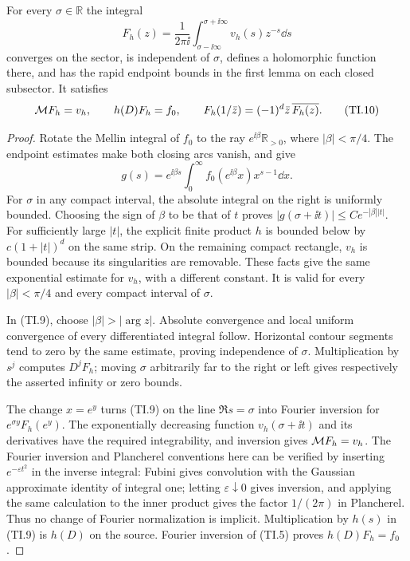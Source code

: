 \begin{proposition}
For every $\sigma\in\mathbb R$ the integral
\begin{equation}
 F_h(z)=\frac1{2\pi\ii}\int_{\sigma-\ii\infty}^{\sigma+\ii\infty}
 v_h(s)z^{-s}\dd s \tag{TI.9}
\end{equation}
converges on the sector, is independent of $\sigma$, defines a
holomorphic function there, and has the rapid endpoint bounds in the
first lemma on each closed subsector. It satisfies
\begin{equation}
 \mathcal M F_h=v_h,\qquad h(D)F_h=f_0,\qquad
 F_h(1/\bar z)=(-1)^d\bar z\,\overline{F_h(z)}. \tag{TI.10}
\end{equation}
\end{proposition}
\begin{proof}
Rotate the Mellin integral of $f_0$ to the ray $e^{\ii\beta}\mathbb R_{>0}$,
where $|\beta|<\pi/4$. The endpoint estimates make both closing arcs
vanish, and give
\[
 g(s)=e^{\ii\beta s}\int_0^\infty f_0(e^{\ii\beta}x)x^{s-1}\dd x.
\]
For $\sigma$ in any compact interval, the absolute integral on the
right is uniformly bounded. Choosing the sign of $\beta$ to be that
of $t$ proves $|g(\sigma+\ii t)|\le C e^{-|\beta||t|}$.
For sufficiently large $|t|$, the explicit finite product $h$ is
bounded below by $c(1+|t|)^d$ on the same strip. On the remaining
compact rectangle, $v_h$ is bounded because its singularities are
removable. These facts give the same exponential estimate for $v_h$,
with a different constant. It is valid for every
$|\beta|<\pi/4$ and every compact interval of $\sigma$.

In (TI.9), choose $|\beta|>|\arg z|$. Absolute convergence and local
uniform convergence of every differentiated integral follow.
Horizontal contour segments tend to zero by the same estimate, proving
independence of $\sigma$. Multiplication by $s^j$ computes $D^jF_h$;
moving $\sigma$ arbitrarily far to the right or left gives respectively
the asserted infinity or zero bounds.

The change $x=e^y$ turns (TI.9) on the line $\Re s=\sigma$ into Fourier
inversion for $e^{\sigma y}F_h(e^y)$. The exponentially decreasing
function $v_h(\sigma+\ii t)$ and its derivatives have the required
integrability, and inversion gives $\mathcal M F_h=v_h$. The Fourier inversion
and Plancherel conventions here can be verified by inserting
$e^{-\varepsilon t^2}$ in the inverse integral: Fubini gives convolution
with the Gaussian approximate identity of integral one; letting
$\varepsilon\downarrow0$ gives inversion, and applying the same
calculation to the inner product gives the factor $1/(2\pi)$ in
Plancherel. Thus no change of Fourier normalization is implicit.
Multiplication by $h(s)$ in (TI.9) is $h(D)$ on the source. Fourier
inversion of (TI.5) proves $h(D)F_h=f_0$.


\end{proof}
